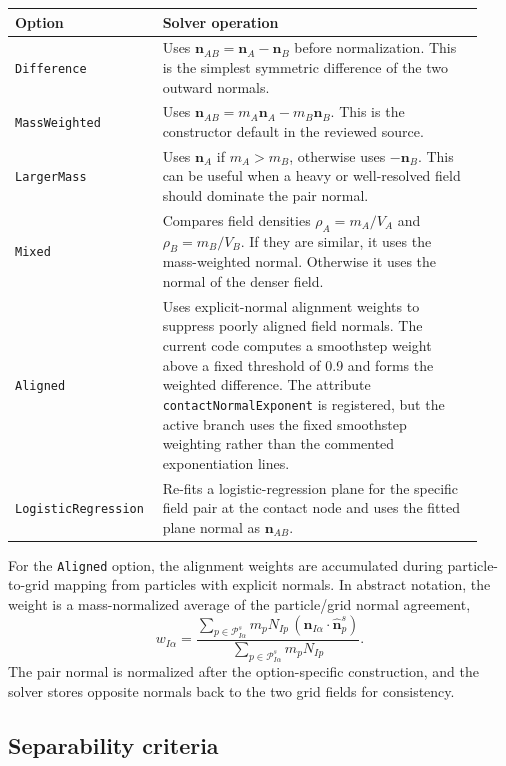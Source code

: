 \begin{longtable}{p{0.27\linewidth}p{0.66\linewidth}}
\toprule
Option & Solver operation \\
\midrule
\endhead
\texttt{Difference} & Uses $\mathbf{n}_{AB}=\mathbf{n}_A-\mathbf{n}_B$ before normalization.  This is the simplest symmetric difference of the two outward normals. \\
\texttt{MassWeighted} & Uses $\mathbf{n}_{AB}=m_A\mathbf{n}_A-m_B\mathbf{n}_B$.  This is the constructor default in the reviewed source. \\
\texttt{LargerMass} & Uses $\mathbf{n}_A$ if $m_A>m_B$, otherwise uses $-\mathbf{n}_B$.  This can be useful when a heavy or well-resolved field should dominate the pair normal. \\
\texttt{Mixed} & Compares field densities $\rho_A=m_A/V_A$ and $\rho_B=m_B/V_B$.  If they are similar, it uses the mass-weighted normal.  Otherwise it uses the normal of the denser field. \\
\texttt{Aligned} & Uses explicit-normal alignment weights to suppress poorly aligned field normals.  The current code computes a smoothstep weight above a fixed threshold of 0.9 and forms the weighted difference.  The attribute \texttt{contactNormalExponent} is registered, but the active branch uses the fixed smoothstep weighting rather than the commented exponentiation lines. \\
\texttt{LogisticRegression} & Re-fits a logistic-regression plane for the specific field pair at the contact node and uses the fitted plane normal as $\mathbf{n}_{AB}$. \\
\bottomrule
\end{longtable}

For the \texttt{Aligned} option, the alignment weights are accumulated during particle-to-grid mapping from particles with explicit normals.  In abstract notation, the weight is a mass-normalized average of the particle/grid normal agreement,
\begin{equation}
  w_{I\alpha}=\frac{\sum_{p\in\mathcal{P}^{s}_{I\alpha}} m_pN_{Ip}\,
  \left(\hat{\mathbf{n}}_{I\alpha}\cdot\hat{\mathbf{n}}^s_p\right)}
  {\sum_{p\in\mathcal{P}^{s}_{I\alpha}} m_pN_{Ip}}.
\end{equation}
The pair normal is normalized after the option-specific construction, and the solver stores opposite normals back to the two grid fields for consistency.

\subsection{Separability criteria}
\label{subsec:contact-separability}


